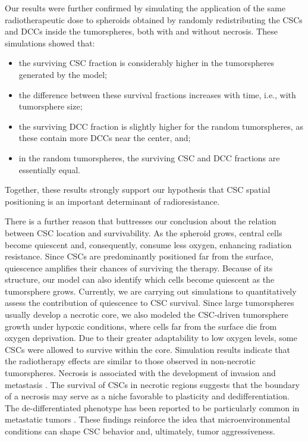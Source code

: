 \documentclass[10pt,letterpaper]{article}
\begin{document}
Our results were further confirmed by simulating the application of the same radiotherapeutic dose to spheroids obtained by randomly redistributing the CSCs and DCCs inside the tumorspheres, both with and without necrosis. These simulations showed that:
\begin{itemize}
	\item[a)] the surviving CSC fraction is considerably higher in the tumorspheres generated by the model;
	\item[b)] the difference between these survival fractions increases with time, i.e., with tumorsphere size;
	\item[c)] the surviving DCC fraction is slightly higher for the random tumorspheres, as these contain more DCCs near the center, and;
	\item[d)] in the random tumorspheres, the surviving CSC and DCC fractions are essentially equal.
\end{itemize}
Together, these results strongly support our hypothesis that CSC spatial positioning is an important determinant of radioresistance.   

There is a further reason that buttresses our conclusion about the relation between CSC location and survivability. As the spheroid grows, central cells become quiescent and, consequently, consume less oxygen, enhancing radiation resistance. Since CSCs are predominantly positioned far from the surface, quiescence amplifies their chances of surviving the therapy. Because of its structure, our model can also identify which cells become quiescent as the tumorsphere grows. Currently, we are carrying out simulations to quantitatively assess the contribution of quiescence to CSC survival. Since large tumorspheres usually develop a necrotic core, we also modeled the CSC-driven tumorsphere growth under hypoxic conditions, where cells far from the surface die from oxygen deprivation. Due to their greater adaptability to low oxygen levels, some CSCs were allowed to survive within the core. Simulation results indicate that the radiotherapy effects are similar to those observed in non-necrotic tumorspheres. Necrosis is associated with the development of invasion and metastasis \cite{yamamoto2023metastasis}. The survival of CSCs in necrotic regions suggests that the boundary of a necrosis may serve as a niche favorable to plasticity and dedifferentiation. The de-differentiated phenotype has been reported to be particularly common in metastatic tumors \cite{malta2018machine}. These findings reinforce the idea that microenvironmental conditions can shape CSC behavior and, ultimately, tumor aggressiveness.
\end{document}

